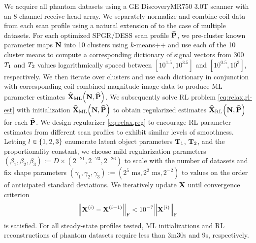 We acquire all phantom datasets 
using a GE Discovery\tmark MR750 3.0T scanner 
with an 8-channel receive head array. 
We separately normalize and combine coil data 
from each scan profile using a natural extension 
of \cite{ying:07:jir} to the case of multiple datasets. 
For each optimized SPGR/DESS scan profile $\widehat{\mathbf{P}}$, 
we pre-cluster known parameter maps $\mathbf{N}$ 
into 10 clusters using $k$-means++ \cite{arthur:07:kmt} 
and use each of the 10 cluster means 
to compute a corresponding dictionary 
of signal vectors from 300 $T_1$ and $T_2$ values 
logarithmically spaced between $[10^{1.5}, 10^{3.5}]$ 
and $[10^{0.5}, 10^3]$, respectively.
We then iterate over clusters 
and use each dictionary in conjunction 
with corresponding coil-combined magnitude image data 
to produce ML parameter estimates 
$\estaML{\bmX}{\bmN,\bmPs}$.
We subsequently solve RL problem \eqref{eq:relax,rl-est} 
with initialization $\estaML{\bmX}{\bmN,\bmPs}$ 
to obtain regularized estimates $\estaRL{\bmX}{\bmN,\bmPs}$ 
for each $\widehat{\mathbf{P}}$. 
We design regularizer \eqref{eq:relax,reg} 
to encourage RL parameter estimates 
from different scan profiles 
to exhibit similar levels of smoothness.
Letting $l \in \set{1, 2, 3}$ enumerate latent object parameters 
$\mathbf{T}_1$, $\mathbf{T}_2$, and the proportionality constant, 
we choose mild regularization parameters 
$(\beta_1, \beta_2, \beta_3) := D \times (2^{-21}, 2^{-23}, 2^{-26})$ 
to scale with the number of datasets
and fix shape parameters
$(\gamma_1, \gamma_2, \gamma_3) := (2^{5} \textrm{ ms}, 2^{2} \textrm{ ms}, 2^{-2})$ 
to values on the order 
of anticipated standard deviations.
We iteratively update $\mathbf{X}$ until convergence criterion 
\begin{align}
	\frob{\iter{\bmX}{i}-\iter{\bmX}{i-1}} < 10^{-7} \frob{\iter{\bmX}{i}}
	\label{eq:scn-dsgn,conv-crit}
\end{align}
is satisfied. 
For all steady-state profiles tested, 
ML initializations and RL reconstructions 
of phantom datasets require less than
3m30s and 9s, respectively.

